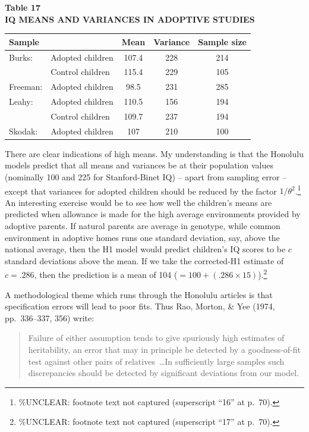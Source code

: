 ﻿\documentclass[12pt]{article}
\begin{document}
\begin{center}
\textbf{Table 17}\\
\textbf{IQ MEANS AND VARIANCES IN ADOPTIVE STUDIES}
\end{center}
\begin{center}
\begin{tabular}{l l c c c}
\hline
Sample & & Mean & Variance & Sample size \\
\hline
Burks: & Adopted children & 107.4 & 228 & 214 \\
 & Control children & 115.4 & 229 & 105 \\
Freeman: & Adopted children & 98.5 & 231 & 285 \\
Leahy: & Adopted children & 110.5 & 156 & 194 \\
 & Control children & 109.7 & 237 & 194 \\
Skodak: & Adopted children & 107 & 210 & 100 \\
\hline
\end{tabular}
\end{center}

There are clear indications of high means. My understanding is that the Honolulu models predict that all means and variances be at their population values (nominally 100 and 225 for Stanford-Binet IQ) -- apart from sampling error -- except that variances for adopted children should be reduced by the factor $1/\theta^2$.\footnote{\%UNCLEAR: footnote text not captured (superscript ``16'' at p.\ 70).} An interesting exercise would be to see how well the children's means are predicted when allowance is made for the high average environments provided by adoptive parents. If natural parents are average in genotype, while common environment in adoptive homes runs one standard deviation, say, above the national average, then the H1 model would predict children's IQ scores to be $c$ standard deviations above the mean. If we take the corrected-H1 estimate of $c=.286$, then the prediction is a mean of 104 ($=100+(.286\times15)$).\footnote{\%UNCLEAR: footnote text not captured (superscript ``17'' at p.\ 70).}

A methodological theme which runs through the Honolulu articles is that specification errors will lead to poor fits. Thus Rao, Morton, \& Yee (1974, pp.\ 336--337, 356) write:

\begin{quote}
Failure of either assumption tends to give spuriously high estimates of heritability, an error that may in principle be detected by a goodness-of-fit test against other pairs of relatives~\ldots In sufficiently large samples such discrepancies should be detected by significant deviations from our model.
\end{quote}
\end{document}
